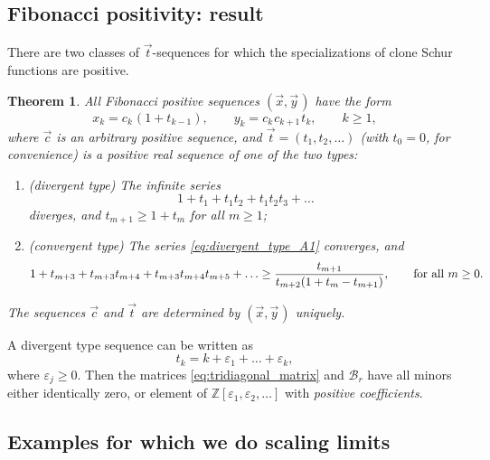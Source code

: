 \documentclass[letterpaper,11pt,oneside,reqno]{article}
\numberwithin{equation}{section}
\newcommand{\ssp}{\hspace{1pt}}
\newtheorem{theorem}[proposition]{Theorem}
\theoremstyle{definition}
\begin{document}
\subsection{Fibonacci positivity: result}

There are two classes of $\vec t$-sequences for which the
specializations of clone Schur functions are positive.
\begin{theorem}
	All Fibonacci positive sequences
	$(\vec x,\vec{y}\ssp)$
	have the form
	\begin{equation*}
		x_k=c_k\ssp (1+t_{k-1}),\qquad y_k=c_k\ssp c_{k+1}\ssp t_k, \qquad k\ge1,
	\end{equation*}
	where $\vec c$ is an
	arbitrary positive sequence,
	and $\vec t=(t_1,t_2,\ldots )$ (with $t_0=0$, for convenience) is
	a positive real sequence of one of the two types:
	\begin{enumerate}[$\bullet$]
		\item (divergent type)
			The infinite series
			\begin{equation}
				\label{eq:divergent_type_A1}
				1+t_1+t_1t_2+t_1t_2t_3+\ldots
			\end{equation}
			diverges, and
			$t_{m+1}\ge 1+t_m$ for all $m\ge 1$;
		\item (convergent type)
			The series \eqref{eq:divergent_type_A1} converges, and
			\begin{equation*}
				 1+t_{m+3}+t_{m+3}t_{m+4}+
				t_{m+3}t_{m+4}t_{m+5}+\ldots
				\ge
				\frac{t_{m+1}}{t_{m+2}(1+t_m-t_{m+1})}
				,
				\qquad
				\textnormal{for all }
				m\ge0.
			\end{equation*}
	\end{enumerate}
	The sequences $\vec c$ and $\vec t$ are determined by $(\vec x,\vec{y}\ssp)$ uniquely.
\end{theorem}

A divergent type sequence can be written
as
\begin{equation*}
	t_k=k+\varepsilon_1+\ldots+\varepsilon_k ,
\end{equation*}
where $\varepsilon_j\ge 0$. Then the matrices
\eqref{eq:tridiagonal_matrix} and $\mathcal{B}_r$
have all minors either identically zero,
or element of $\mathbb{Z}[\varepsilon_1,\varepsilon_2,\ldots ]$
with \emph{positive coefficients}.

\subsection{Examples for which we do scaling limits}
\end{document}
